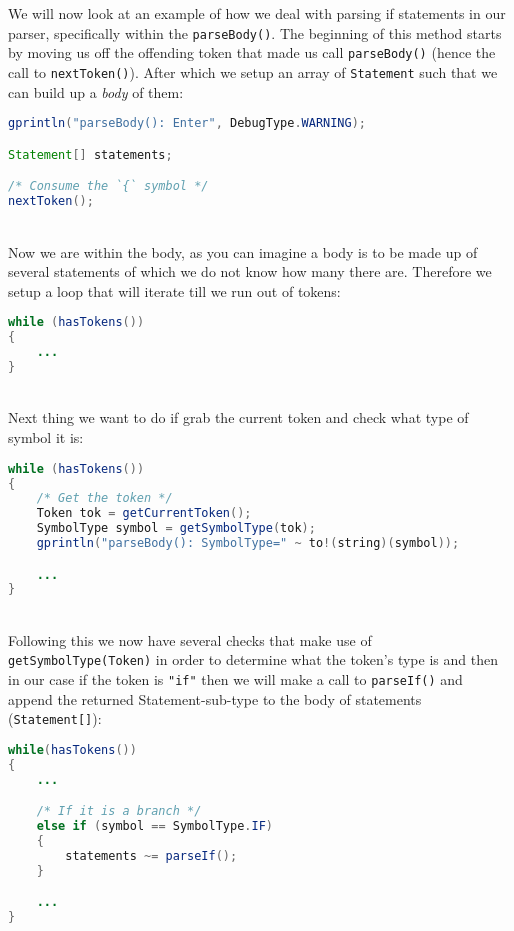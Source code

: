 We will now look at an example of how we deal with parsing if statements
in our parser, specifically within the \texttt{parseBody()}. The
beginning of this method starts by moving us off the offending token
that made us call \texttt{parseBody()} (hence the call to \texttt{nextToken()}).
After which we setup an array of \texttt{Statement} such that we
can build up a \emph{body} of them:\begin{lstlisting}[language=Java]
gprintln("parseBody(): Enter", DebugType.WARNING);

Statement[] statements;

/* Consume the `{` symbol */
nextToken();
\end{lstlisting}~\\
Now we are within the body, as you can imagine a body is to be made
up of several statements of which we do not know how many there are.
Therefore we setup a loop that will iterate till we run out of tokens:\begin{lstlisting}[language=Java]
while (hasTokens())
{
	...
}
\end{lstlisting}~\\
Next thing we want to do if grab the current token and check what
type of symbol it is:\begin{lstlisting}[language=Java]
while (hasTokens())
{
	/* Get the token */
	Token tok = getCurrentToken();
	SymbolType symbol = getSymbolType(tok);
	gprintln("parseBody(): SymbolType=" ~ to!(string)(symbol));

	...
}
\end{lstlisting}~\\
Following this we now have several checks that make use of \texttt{getSymbolType(Token)}
in order to determine what the token's type is and then in our case
if the token is \texttt{"if"} then we will make a call to \texttt{parseIf()}
and append the returned Statement-sub-type to the body of statements
(\texttt{Statement[]}):\begin{lstlisting}[language=Java]
while(hasTokens())
{
	...

	/* If it is a branch */
	else if (symbol == SymbolType.IF)
	{
		statements ~= parseIf();
	}

	...
}
\end{lstlisting}
